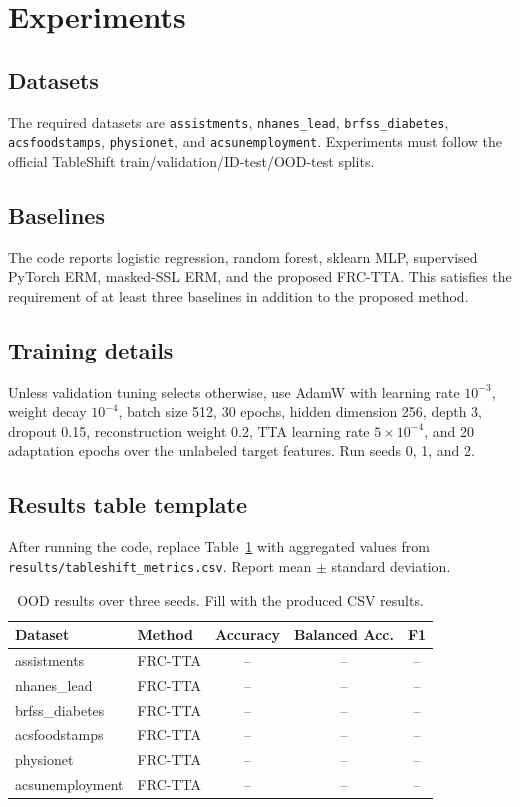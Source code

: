 \IfFileExists{neurips_2025.sty}{\documentclass{article}\usepackage[preprint]{neurips_2025}}{\documentclass[11pt]{article}\usepackage[margin=1in]{geometry}}
\begin{document}
\section{Experiments}
\subsection{Datasets}
The required datasets are \texttt{assistments}, \texttt{nhanes\_lead}, \texttt{brfss\_diabetes}, \texttt{acsfoodstamps}, \texttt{physionet}, and \texttt{acsunemployment}. Experiments must follow the official TableShift train/validation/ID-test/OOD-test splits.

\subsection{Baselines}
The code reports logistic regression, random forest, sklearn MLP, supervised PyTorch ERM, masked-SSL ERM, and the proposed FRC-TTA. This satisfies the requirement of at least three baselines in addition to the proposed method.

\subsection{Training details}
Unless validation tuning selects otherwise, use AdamW with learning rate $10^{-3}$, weight decay $10^{-4}$, batch size 512, 30 epochs, hidden dimension 256, depth 3, dropout 0.15, reconstruction weight 0.2, TTA learning rate $5\times10^{-4}$, and 20 adaptation epochs over the unlabeled target features. Run seeds 0, 1, and 2.

\subsection{Results table template}
After running the code, replace Table~\ref{tab:results} with aggregated values from \texttt{results/tableshift\_metrics.csv}. Report mean $\pm$ standard deviation.
\begin{table}[h]
\centering
\caption{OOD results over three seeds. Fill with the produced CSV results.}
\label{tab:results}
\begin{tabular}{llccc}
\toprule
Dataset & Method & Accuracy & Balanced Acc. & F1 \\
\midrule
assistments & FRC-TTA & -- & -- & -- \\
nhanes\_lead & FRC-TTA & -- & -- & -- \\
brfss\_diabetes & FRC-TTA & -- & -- & -- \\
acsfoodstamps & FRC-TTA & -- & -- & -- \\
physionet & FRC-TTA & -- & -- & -- \\
acsunemployment & FRC-TTA & -- & -- & -- \\
\bottomrule
\end{tabular}
\end{table}
\end{document}
